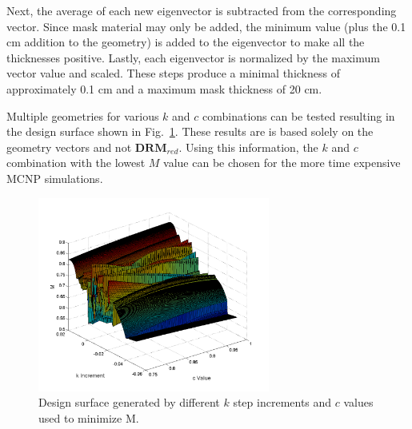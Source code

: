 \documentclass[3p,times]{elsarticle}
\begin{document}
Next, the average of each new eigenvector is subtracted from the corresponding vector. 
Since mask material may only be added, the minimum value (plus the 0.1 cm addition to the geometry) is added to the eigenvector to make all the thicknesses positive.  
Lastly, each eigenvector is normalized by the maximum vector value and scaled. 
These steps produce a minimal thickness of approximately 0.1 cm and a maximum mask thickness of 20 cm.

Multiple geometries for various $k$ and $c$ combinations can be tested resulting in the design surface shown in Fig.~\ref{fig:surf}.  
These results are is based solely on the geometry vectors and not $\mathbf{DRM}_{red}$.  
Using this information, the $k$ and $c$ combination with the lowest $M$ value can be chosen for the more time expensive MCNP simulations.

\begin{figure}[ht!]
\includegraphics[width={3.0in}]{../figs/Eigprob32bitCouple2W1.pdf}
\centering
\caption{Design surface generated by different $k$ step increments and $c$ values used to minimize M.}
\label{fig:surf}
\end{figure}
\end{document}

